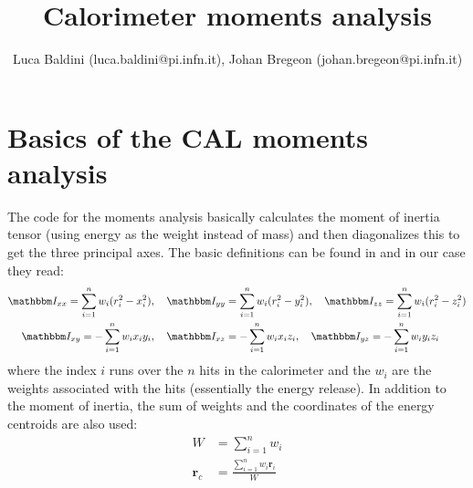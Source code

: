 \documentclass[a4paper,11pt]{article}
\title{Calorimeter moments analysis}
\author{Luca Baldini (luca.baldini@pi.infn.it),
  Johan Bregeon (johan.bregeon@pi.infn.it)}
\newcommand{\itm}{\mathbbm I}
\newcommand{\itc}[1]{\itm_{#1}}
\begin{document}
\maketitle



\section{Basics of the CAL moments analysis}

The code for the moments analysis basically calculates the moment of inertia
tensor (using energy as the weight instead of mass) and then diagonalizes this
to get the three principal axes. The basic definitions can be found in
\cite{goldstein,landau} and in our case they read:
\begin{align}
  \itc{xx}  = \sum_{i=1}^n w_i(r_i^2 - x_i^2),\quad
  \itc{yy} &= \sum_{i=1}^n w_i(r_i^2 - y_i^2),\quad
  \itc{zz}  = \sum_{i=1}^n w_i(r_i^2 - z_i^2)\\
  \itc{xy}  = -\sum_{i=1}^n w_ix_iy_i,\quad
  \itc{xz} &= -\sum_{i=1}^n w_ix_iz_i,\quad
  \itc{yz}  = -\sum_{i=1}^n w_iy_iz_i
\end{align}
where the index $i$ runs over the $n$ hits in the calorimeter and the $w_i$ are
the weights associated with the hits (essentially the energy release).
In addition to the moment of inertia, the sum of weights and the coordinates
of the energy centroids are also used:
\begin{align}
  W &= \sum_{i=1}^n w_i\\
  \mathbf{r}_c &= \frac{\sum_{i=1}^n w_i\mathbf{r}_i}{W}
\end{align}
\end{document}
